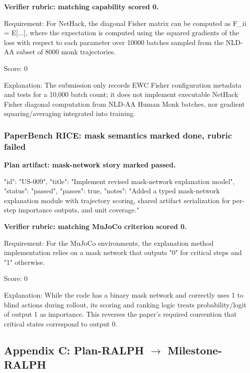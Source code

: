 \documentclass[11pt,a4paper]{article}
\begin{document}
\textbf{Verifier rubric: matching capability scored 0.}

\begin{cbox}
Requirement:
For NetHack, the diagonal Fisher matrix can be computed as F_ii = E[...],
where the expectation is computed using the squared gradients of the loss
with respect to each parameter over 10000 batches sampled from the NLD-AA
subset of 8000 monk trajectories.

Score: 0

Explanation:
The submission only records EWC Fisher configuration metadata and tests for a
10,000 batch count; it does not implement executable NetHack Fisher diagonal
computation from NLD-AA Human Monk batches, nor gradient squaring/averaging
integrated into training.
\end{cbox}

\subsubsection{PaperBench RICE: mask semantics marked done, rubric failed}

\textbf{Plan artifact: mask-network story marked passed.}

\begin{cbox}
{
  "id": "US-009",
  "title": "Implement revised mask-network explanation model",
  "status": "passed",
  "passes": true,
  "notes": "Added a typed mask-network explanation module with trajectory scoring, shared artifact serialization for per-step importance outputs, and unit coverage."
}
\end{cbox}

\textbf{Verifier rubric: matching MuJoCo criterion scored 0.}

\begin{cbox}
Requirement:
For the MuJoCo environments, the explanation method implementation relies on
a mask network that outputs "0" for critical steps and "1" otherwise.

Score: 0

Explanation:
While the code has a binary mask network and correctly uses 1 to blind actions
during rollout, its scoring and ranking logic treats probability/logit of
output 1 as importance. This reverses the paper's required convention that
critical states correspond to output 0.
\end{cbox}

\subsection{Appendix C: Plan-RALPH $\rightarrow$ Milestone-RALPH}
\end{document}

